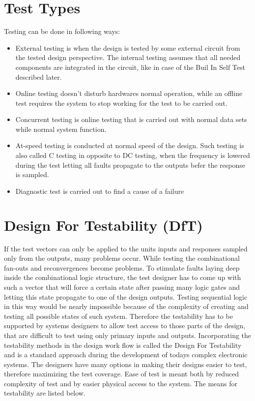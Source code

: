 \section{Test Types}
Testing can be done in following ways:
\begin{itemize}
    \item External testing is when the design is tested by some external circuit from the tested design perspective. The internal testing assumes that all needed components are integrated in the circuit, like in case of the Buil In Self Test described later.
    \item Online testing doesn't disturb hardwares normal operation, while an offline test requires the system to stop working for the test to be carried out.
    \item Concurrent testing is online testing that is carried out with normal data sets while normal system function.
    \item At-speed testing is conducted at normal speed of the design. Such testing is also called C testing in opposite to DC testing, when the frequency is lowered during the test letting all faults propagate to the outputs befer the response is sampled.
    \item Diagnostic test is carried out to find a cause of a failure
\end{itemize}

\section{Design For Testability (DfT)}
If the test vectors can only be applied to the units inputs and responses sampled only from the outputs, many problems occur. While testing the combinational fan-outs and reconvergences become problems. To stimulate faults laying deep inside the combinational logic structure, the test designer has to come up with such a vector that will force a certain state after passing many logic gates and letting this state propagate to one of the design outputs. Testing sequential logic in this way would be nearly impossible because of the complexity of creating and testing all possible states of such system. Therefore the testability has to be supported by systems designers to allow test access to those parts of the design, that are difficult to test using only primary inputs and outputs. Incorporating the testability methods in the design work flow is called the Design For Testability and is a standard approach during the development of todays complex electronic systems. The designers have many options in making their designs easier to test, therefore maximizing the test coverage. Ease of test is meant both by reduced complexity of test and by easier physical access to the system. The means for testability are listed below.
